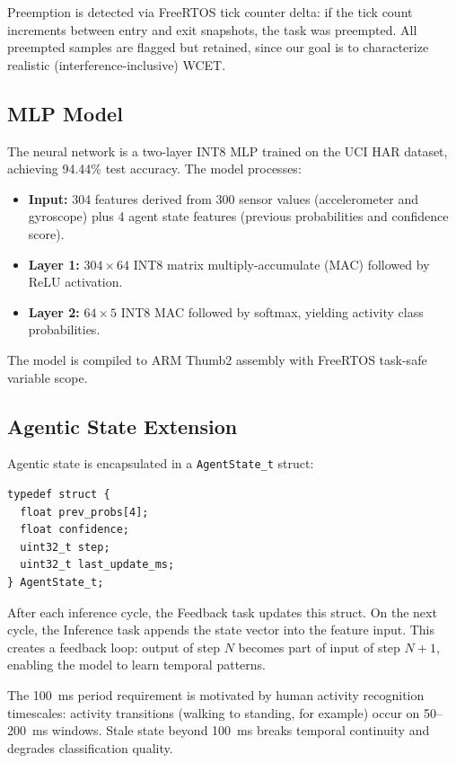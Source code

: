 \documentclass[conference]{IEEEtran}
\begin{document}
Preemption is detected via FreeRTOS tick counter delta: if the tick count increments between entry and exit snapshots, the task was preempted. All preempted samples are flagged but retained, since our goal is to characterize realistic (interference-inclusive) WCET.

\subsection{MLP Model}

The neural network is a two-layer INT8 MLP trained on the UCI HAR dataset, achieving 94.44\% test accuracy. The model processes:
\begin{itemize}
\item \textbf{Input:} 304 features derived from 300 sensor values (accelerometer and gyroscope) plus 4 agent state features (previous probabilities and confidence score).
\item \textbf{Layer 1:} $304 \times 64$ INT8 matrix multiply-accumulate (MAC) followed by ReLU activation.
\item \textbf{Layer 2:} $64 \times 5$ INT8 MAC followed by softmax, yielding activity class probabilities.
\end{itemize}

The model is compiled to ARM Thumb2 assembly with FreeRTOS task-safe variable scope.

\subsection{Agentic State Extension}

Agentic state is encapsulated in a \texttt{AgentState\_t} struct:
\begin{verbatim}
typedef struct {
  float prev_probs[4];
  float confidence;
  uint32_t step;
  uint32_t last_update_ms;
} AgentState_t;
\end{verbatim}

After each inference cycle, the Feedback task updates this struct. On the next cycle, the Inference task appends the state vector into the feature input. This creates a feedback loop: output of step $N$ becomes part of input of step $N+1$, enabling the model to learn temporal patterns.

The 100~ms period requirement is motivated by human activity recognition timescales: activity transitions (walking to standing, for example) occur on 50--200~ms windows. Stale state beyond 100~ms breaks temporal continuity and degrades classification quality.
\end{document}
